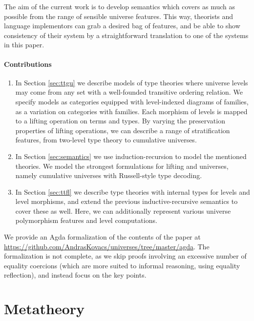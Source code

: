 \documentclass[a4paper,UKenglish,cleveref, autoref, thm-restate]{lipics-v2021}
\theoremstyle{remark}
\theoremstyle{definition}
\begin{document}
The aim of the current work is to develop semantics which covers as much as
possible from the range of sensible universe features. This way, theorists and
language implementors can grab a desired bag of features, and be able to show
consistency of their system by a straightforward translation to one of the
systems in this paper.

\paragraph*{Contributions}

\begin{enumerate}
\item In Section \ref{sec:ttgu} we describe models of type theories where
  universe levels may come from any set with a well-founded transitive ordering
  relation. We specify models as categories equipped with level-indexed diagrams
  of families, as a variation on categories with families. Each morphism of
  levels is mapped to a lifting operation on terms and types. By varying the
  preservation properties of lifting operations, we can describe a range of
  stratification features, from two-level type theory to cumulative universes.
\item In Section \ref{sec:semantics} we use induction-recursion to model the mentioned theories. We
  model the strongest formulations for lifting and universes, namely cumulative universes with
  Russell-style type decoding.
\item In Section \ref{sec:ttfl} we describe type theories with internal types
  for levels and level morphisms, and extend the previous inductive-recursive
  semantics to cover these as well. Here, we can additionally represent various
  universe polymorphism features and level computations.
\end{enumerate}

We provide an Agda formalization of the contents of the paper at
\url{https://github.com/AndrasKovacs/universes/tree/master/agda}. The
formalization is not complete, as we skip proofs involving an excessive number
of equality coercions (which are more suited to informal reasoning, using
equality reflection), and instead focus on the key points.

\section{Metatheory}
\label{sec:metatheory}
\end{document}
